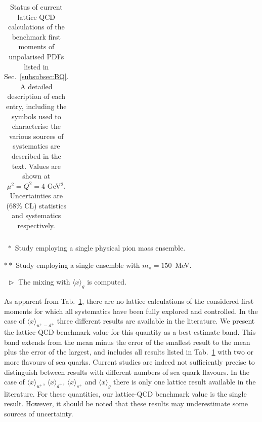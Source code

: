 \begin{table}[!t]
\begin{threeparttable}
\begin{tabular}{llcllccccccl}
\bottomrule
\end{tabular}
\begin{tablenotes}
\footnotesize
\item[$\ \,*$] Study employing a single physical pion mass ensemble.
\item[$**$] Study employing a single ensemble with $m_\pi=150$~MeV.
\item[$\ \,\triangleright$] The mixing with $\langle x\rangle_{g}$ is computed.
\end{tablenotes}
\end{threeparttable}
\caption{\small Status of current lattice-QCD calculations of the benchmark 
first moments of unpolarised PDFs listed in Sec.~\ref{subsubsec:BQ}.
%
A detailed description of each entry, including the symbols used to 
characterise the various sources of systematics are described in the text.
%
Values are shown at $\mu^2=Q^2=4$ GeV$^2$.
%
Uncertainties are (68\% CL) statistics and systematics respectively.}
\label{tab:unpolLQCDstatus1}
\end{table}

As apparent from Tab.~\ref{tab:unpolLQCDstatus1}, there are no lattice 
calculations of the considered first moments for which all systematics 
have been fully explored and controlled. 
%
In the case of $\langle x\rangle_{u^+-d^+}$ three different results are available 
in the literature.
%
We present the lattice-QCD benchmark value for this quantity 
as a best-estimate band.
% 
This band extends from the mean minus the error of the smallest result to the 
mean plus the error of the largest, and includes all results listed in 
Tab.~\ref{tab:unpolLQCDstatus1} with two or more flavours of sea quarks.
%
Current studies are indeed not sufficiently precise to distinguish between 
results with different numbers of sea quark flavours.
%
In the case of $\langle x \rangle_{u^+}$, $\langle x \rangle_{d^+}$, 
$\langle x \rangle_{s^+}$ and $\langle x \rangle_g$ there is only one
lattice result available in the literature. 
%
For these quantities, our lattice-QCD benchmark value is the single result.
% 
However, it should be noted that these results may underestimate some sources 
of uncertainty. 

